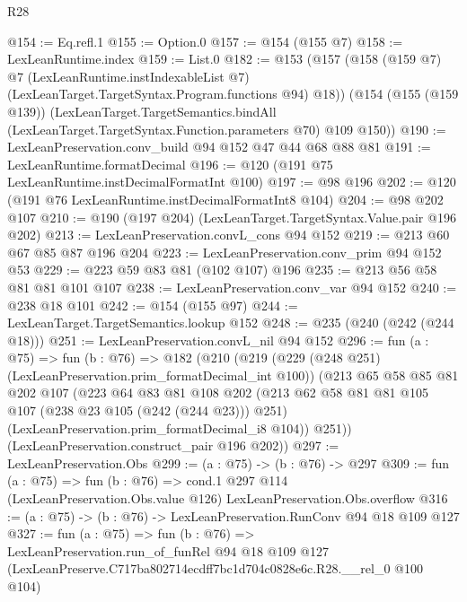 \begin{lexlean}{R28}
\begin{coremodule}
@154 := Eq.refl.{1}
@155 := Option.{0}
@157 := @154 (@155 @7)
@158 := LexLeanRuntime.index
@159 := List.{0}
@182 := @153
    (@157
      (@158
        (@159 @7)
        @7
        (LexLeanRuntime.instIndexableList @7)
        (LexLeanTarget.TargetSyntax.Program.functions @94)
        @18))
    (@154
      (@155 (@159 @139))
      (LexLeanTarget.TargetSemantics.bindAll
        (LexLeanTarget.TargetSyntax.Function.parameters @70)
        @109
        @150))
@190 := LexLeanPreservation.conv_build @94 @152 @47 @44 @68 @88 @81
@191 := LexLeanRuntime.formatDecimal
@196 := @120 (@191 @75 LexLeanRuntime.instDecimalFormatInt @100)
@197 := @98 @196
@202 := @120 (@191 @76 LexLeanRuntime.instDecimalFormatInt8 @104)
@204 := @98 @202 @107
@210 := @190 (@197 @204) (LexLeanTarget.TargetSyntax.Value.pair @196 @202)
@213 := LexLeanPreservation.convL_cons @94 @152
@219 := @213 @60 @67 @85 @87 @196 @204
@223 := LexLeanPreservation.conv_prim @94 @152 @53
@229 := @223 @59 @83 @81 (@102 @107) @196
@235 := @213 @56 @58 @81 @81 @101 @107
@238 := LexLeanPreservation.conv_var @94 @152
@240 := @238 @18 @101
@242 := @154 (@155 @97)
@244 := LexLeanTarget.TargetSemantics.lookup @152
@248 := @235 (@240 (@242 (@244 @18)))
@251 := LexLeanPreservation.convL_nil @94 @152
@296 := fun (a : @75) =>
  fun (b : @76) =>
  @182
    (@210
      (@219
        (@229 (@248 @251) (LexLeanPreservation.prim_formatDecimal_int @100))
        (@213
          @65
          @58
          @85
          @81
          @202
          @107
          (@223
            @64
            @83
            @81
            @108
            @202
            (@213 @62 @58 @81 @81 @105 @107 (@238 @23 @105 (@242 (@244 @23))) @251)
            (LexLeanPreservation.prim_formatDecimal_i8 @104))
          @251))
      (LexLeanPreservation.construct_pair @196 @202))
@297 := LexLeanPreservation.Obs
@299 := (a : @75) -> (b : @76) -> @297
@309 := fun (a : @75) =>
  fun (b : @76) =>
  cond.{1} @297 @114 (LexLeanPreservation.Obs.value @126) LexLeanPreservation.Obs.overflow
@316 := (a : @75) -> (b : @76) -> LexLeanPreservation.RunConv @94 @18 @109 @127
@327 := fun (a : @75) =>
  fun (b : @76) =>
  LexLeanPreservation.run_of_funRel
    @94
    @18
    @109
    @127
    (LexLeanPreserve.C717ba802714ecdff7bc1d704c0828e6c.R28.__rel_0 @100 @104)
\end{coremodule}
\end{lexlean}
